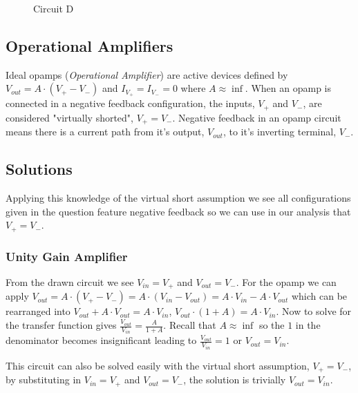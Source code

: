 \documentclass[main.tex]{subfiles}
\begin{document}
\begin{figure}[h!]
    \begin{center}
        \begin{circuitikz}[american]
            \label{fig:difference_amp}
        \end{circuitikz}
        \caption{Circuit D}
    \end{center}
\end{figure}

\spoilerline

\subsection{Operational Amplifiers}
Ideal opamps (\textit{Operational Amplifier}) are active devices defined by $V_{out} = A \cdot (V_{+} - V_{-})$ and $I_{V_{+}} = I_{V_{-}} = 0$ where $A \approx \inf$. When an opamp is connected in a negative feedback configuration, the inputs, $V_{+}$ and $V_{-}$, are considered "virtually shorted", $V_{+} = V_{-}$. Negative feedback in an opamp circuit means there is a current path from it's output, $V_{out}$, to it's inverting terminal, $V_{-}$.


\subsection{Solutions}
Applying this knowledge of the virtual short assumption we see all configurations given in the question feature negative feedback so we can use in our analysis that $V_{+} = V_{-}$. 

\subsubsection{Unity Gain Amplifier}
From the drawn circuit we see $V_{in} = V_{+}$ and $V_{out} = V_{-}$. For the opamp we can apply $V_{out} = A \cdot (V_{+} - V_{-}) = A \cdot (V_{in} - V_{out}) = A \cdot V_{in} - A \cdot V_{out}$ which can be rearranged into $V_{out} + A \cdot V_{out} = A \cdot V_{in}$, $V_{out} \cdot (1 + A) = A \cdot V_{in}$. Now to solve for the transfer function gives $\frac{V_{out}}{V_{in}} = \frac{A}{1+A}$. Recall that $A \approx \inf$ so the $1$ in the denominator becomes insignificant leading to $\frac{V_{out}}{V_{in}} = 1$ or $V_{out} = V_{in}$.

This circuit can also be solved easily with the virtual short assumption, $V_{+} = V_{-}$, by substituting in $V_{in} = V_{+}$ and $V_{out} = V_{-}$, the solution is trivially $V_{out} = V_{in}$.
\end{document}
